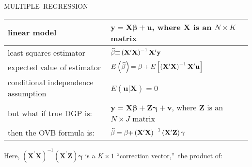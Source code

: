 \documentclass[11pt]{article}
\begin{document}
\newpage 

{\small MULTIPLE\ REGRESSION}\bigskip 

\begin{tabular}{ll}
\hline
{\small linear model} & $\mathbf{y=X\beta +u}$, where $\mathbf{X}$ is an $%
N\times K$ matrix \\ \hline
{\small least-squares estimator} & $\widehat{\mathbf{\beta }}{\small \equiv }%
\left( \mathbf{X}^{\prime }\mathbf{X}\right) ^{-1}\mathbf{X}^{\prime }%
\mathbf{y}$ \\ \hline
{\small expected value of estimator} & ${\small E}\left( \widehat{\mathbf{%
\beta }}\right) {\small =\mathbf{\beta }+E}\left[ \left( \mathbf{X}^{\prime }%
\mathbf{X}\right) ^{-1}\mathbf{X}^{\prime }\mathbf{u}\right] $ \\ \hline
{\small conditional independence assumption} & $E\left( \mathbf{u}|\mathbf{X}%
\right) =0${\small \ } \\ \hline
but what if true DGP is: & $\mathbf{y=X\beta +Z\gamma +v}$, where $\mathbf{Z}
$ is an $N\times J$ matrix \\ \hline
then the {\small OVB formula is:} & $\widehat{\mathbf{\beta }}=\mathbf{%
\mathbf{\beta +}}\left( \mathbf{X}^{\prime }\mathbf{X}\right) ^{-1}\left( 
\mathbf{X}^{\prime }\mathbf{Z}\right) \mathbf{\gamma }$ \\ \hline
\end{tabular}

\bigskip Here, $\left( \mathbf{X}^{\prime }\mathbf{X}\right) ^{-1}\left( 
\mathbf{X}^{\prime }\mathbf{Z}\right) \mathbf{\gamma }$ is a $K\times 1$
\textquotedblleft correction vector,\textquotedblright\ the product of:
\end{document}
